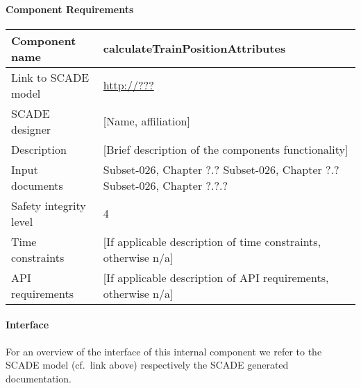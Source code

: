 
\paragraph{Component Requirements}

\begin{longtable}{p{}p{}}
\toprule
Component name			& calculateTrainPositionAttributes \\
\midrule
Link to SCADE model		& {\footnotesize \url{http://???}} \\
\midrule
SCADE designer			& [Name, affiliation] \\
\midrule
Description				& [Brief description of the components functionality] \\
\midrule
Input documents	& 
Subset-026, Chapter ?.?\newline
Subset-026, Chapter ?.?\newline
Subset-026, Chapter ?.?.?\\
\midrule
Safety integrity level		& 4 \\
\midrule
Time constraints		& [If applicable description of time constraints, otherwise n/a] \\
\midrule
API requirements 		& [If applicable description of API requirements, otherwise n/a] \\
\bottomrule
\end{longtable}


\paragraph{Interface}

For an overview of the interface of this internal component we refer to the SCADE model (cf.~link above) respectively the SCADE generated documentation.
